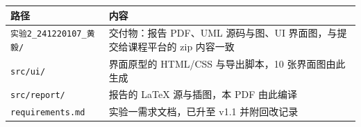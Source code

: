 \begin{center}
\label{tab:repo}
\renewcommand{\arraystretch}{1.15}
\begin{tabularx}{\textwidth}{@{}p{4.3cm}Y@{}}
\toprule
路径 & 内容 \\
\midrule
\texttt{实验2\_241220107\_黄毅/} & 交付物：报告 PDF、UML 源码与图、UI 界面图，与提交给课程平台的 zip 内容一致 \\
\texttt{src/ui/} & 界面原型的 HTML/CSS 与导出脚本，10 张界面图由此生成 \\
\texttt{src/report/} & 报告的 LaTeX 源与插图，本 PDF 由此编译 \\
\texttt{requirements.md} & 实验一需求文档，已升至 v1.1 并附回改记录 \\
\bottomrule
\end{tabularx}
\end{center}
